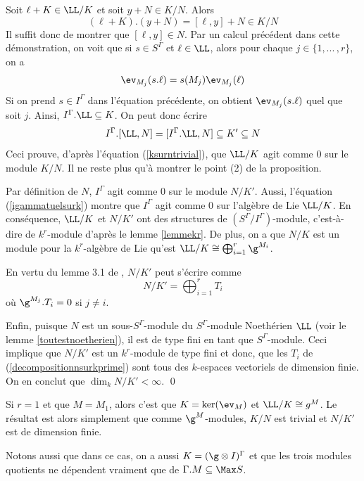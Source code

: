 \begin{Prop}
\begin{pre}
Soit $\ell + K \in \LL/K$ et soit $y + N \in K/N$. Alors
\begin{equation} \label{ksurntrivial}
(\ell + K).(y + N) = [\ell, y] + N \in K/N
\end{equation}
Il suffit donc de montrer que $[\ell,y] \in N$. Par un calcul précédent dans cette démonstration, on voit que si $s \in S^\Gamma$ et $\ell \in \LL$, alors pour chaque $j \in \{1,...\,,r\}$, on a
\begin{equation} \label{igammatuelsurk}
\ev_{M_j}(s.\ell) = s(M_j)\ev_{M_j}(\ell)
\end{equation}
Si on prend $s \in I^\Gamma$ dans l'équation précédente, on obtient $\ev_{M_j}(s.\ell)$ quel que soit $j$. Ainsi, $I^\Gamma.\LL \subseteq K$. On peut donc écrire 
$$ I^\Gamma.[\LL,N] = [I^\Gamma.\LL,N] \subseteq K' \subseteq N $$
Ceci prouve, d'après l'équation (\ref{ksurntrivial}), que $\LL/K$ agit comme 0 sur le module $K/N$. Il ne reste plus qu'à montrer le point (2) de la proposition.

Par définition de $N$, $I^\Gamma$ agit comme 0 sur le module $N/K'$. Aussi, l'équation (\ref{igammatuelsurk}) montre que $I^\Gamma$ agit comme 0 sur l'algèbre de Lie $\LL/K$. En conséquence, $\LL/K$ et $N/K'$ ont des structures de $(S^\Gamma/I^\Gamma)$-module, c'est-à-dire de $k^r$-module d'après le lemme \ref{lemmekr}. De plus, on a que $N/K$ est un module pour la $k^r$-algèbre de Lie qu'est $\LL/K \cong \bigoplus_{i=1}^r \g^{M_i}$.

En vertu du lemme 3.1 de \cite{NSext}, $N/K'$ peut s'écrire comme
\begin{equation} \label{decompositionnsurkprime}
N/K' = \bigoplus_{i=1}^r T_i
\end{equation}
où $\g^{M_j}.T_i = 0$ si $j \neq i$.

Enfin, puisque $N$ est un sous-$S^\Gamma$-module du $S^\Gamma$-module Noethérien $\LL$ (voir le lemme \ref{toutestnoetherien}), il est de type fini en tant que $S^\Gamma$-module. Ceci implique que $N/K'$ est un $k^r$-module de type fini et donc, que les $T_i$ de (\ref{decompositionnsurkprime}) sont tous des $k$-espaces vectoriels de dimension finie. On en conclut que $\dim_k N/K' < \infty$. \qed
\end{pre}
\end{Prop}

\begin{Rem} Si $r = 1$ et que $M = M_1$, alors c'est que $K = \ker (\ev_M)$ et $\LL / K \cong g^M$. Le résultat est alors simplement que comme $\g^M$-modules, $K/N$ est trivial et $N/K'$ est de dimension finie.

Notons aussi que dans ce cas, on a aussi $K = (\g \otimes I)^\Gamma$ et que les trois modules quotients ne dépendent vraiment que de $\Gamma.M \subseteq \Max S$.
\end{Rem}



